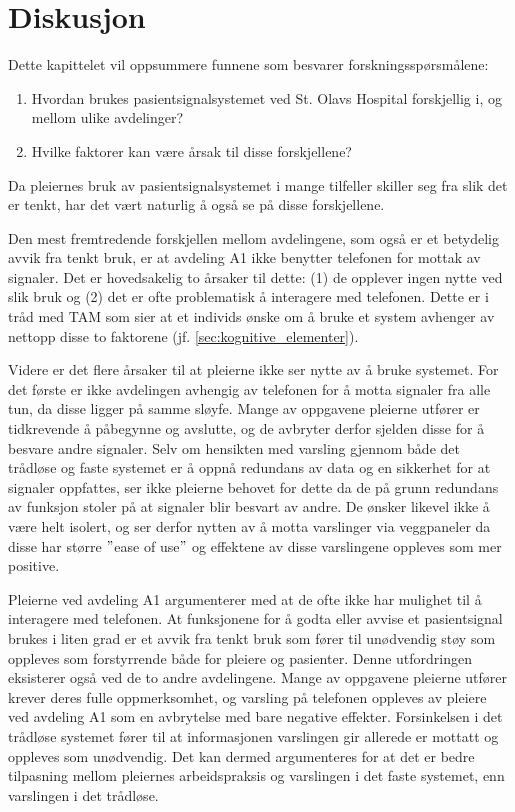 \chapter{Diskusjon}
\label{chp:diskusjon_rq}
Dette kapittelet vil oppsummere funnene som besvarer forskningsspørsmålene:

\begin{enumerate}
\item Hvordan brukes pasientsignalsystemet ved St. Olavs Hospital forskjellig i, og mellom ulike avdelinger? 
\item Hvilke faktorer kan være årsak til disse forskjellene?
\end{enumerate}

\noindent
Da pleiernes bruk av pasientsignalsystemet i mange tilfeller skiller seg fra slik det er tenkt, har det vært naturlig å også se på disse forskjellene.

\noindent
Den mest fremtredende forskjellen mellom avdelingene, som også er et betydelig avvik fra tenkt bruk, er at avdeling A1 ikke benytter telefonen for mottak av signaler. Det er hovedsakelig to årsaker til dette: (1) de opplever ingen nytte ved slik bruk og (2) det er ofte problematisk å interagere med telefonen. Dette er i tråd med TAM som sier at et individs ønske om å bruke et system avhenger av nettopp disse to faktorene (jf. \ref{sec:kognitive_elementer}). 

\noindent
Videre er det flere årsaker til at pleierne ikke ser nytte av å bruke systemet. For det første er ikke avdelingen avhengig av telefonen for å motta signaler fra alle tun, da disse ligger på samme sløyfe. Mange av oppgavene pleierne utfører er tidkrevende å påbegynne og avslutte, og de avbryter derfor sjelden disse for å besvare andre signaler. Selv om hensikten med varsling gjennom både det trådløse og faste systemet er å oppnå redundans av data og en sikkerhet for at signaler oppfattes, ser ikke pleierne behovet for dette da de på grunn redundans av funksjon stoler på at signaler blir besvart av andre. De ønsker likevel ikke å være helt isolert, og ser derfor nytten av å motta varslinger via veggpaneler da disse har større $"$ease of use$"$ og effektene av disse varslingene oppleves som mer positive. 

\noindent
Pleierne ved avdeling A1 argumenterer med at de ofte ikke har mulighet til å interagere med telefonen. At funksjonene for å godta eller avvise et pasientsignal brukes i liten grad er et avvik fra tenkt bruk som fører til unødvendig støy som oppleves som forstyrrende både for pleiere og pasienter. Denne utfordringen eksisterer også ved de to andre avdelingene. Mange av oppgavene pleierne utfører krever deres fulle oppmerksomhet, og varsling på telefonen oppleves av pleiere ved avdeling A1 som en avbrytelse med bare negative effekter. Forsinkelsen i det trådløse systemet fører til at informasjonen varslingen gir allerede er mottatt og oppleves som unødvendig. Det kan dermed argumenteres for at det er bedre tilpasning mellom pleiernes arbeidspraksis og varslingen i det faste systemet, enn varslingen i det trådløse.

